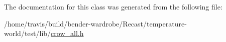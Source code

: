 The documentation for this class was generated from the following file\-:\begin{DoxyCompactItemize}
\item 
/home/travis/build/bender-\/wardrobe/\-Recast/temperature-\/world/test/lib/\hyperlink{crow__all_8h}{crow\-\_\-all.\-h}\end{DoxyCompactItemize}
